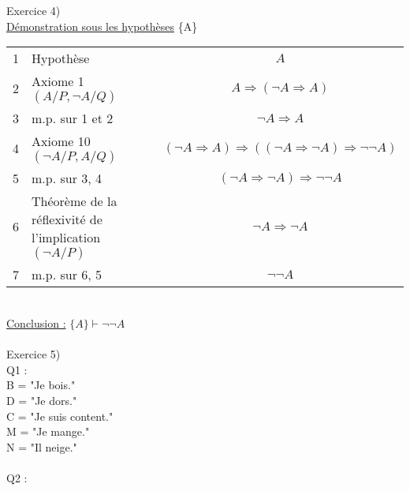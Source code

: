 \documentclass{article}
\begin{document}
\vspace*{3mm}
\newline
\\
\\
Exercice 4)
\newline
\\
\underline{Démonstration sous les hypothèses} \{A\}
\newline
\\
\begin{tabular}{|C{2mm}|l c}
1 & Hypothèse & $A$  \\ 
2 & Axiome 1 $(A/P, \neg A/Q)$ & $A \Rightarrow (\neg A \Rightarrow A)$  \\ 
3 & m.p. sur 1 et 2 & $\neg A \Rightarrow A$  \\ 
4 & Axiome 10  $(\neg A/P, A/Q)$ & $(\neg A \Rightarrow A) \Rightarrow ((\neg A \Rightarrow \neg A) \Rightarrow \neg\neg A)$ \\ 
5 & m.p. sur 3, 4 & $(\neg A \Rightarrow \neg A) \Rightarrow \neg\neg A$ \\ 
6 & Théorème de la réflexivité de l'implication $(\neg A/P)$ & $\neg A \Rightarrow \neg A$  \\ 
7 & m.p. sur 6, 5 & $\neg\neg A$ \\ 
\end{tabular}
\vspace*{1mm}
\newline
\\
\underline{Conclusion :} $\{A\} \vdash \neg\neg A$
\newline
\\
\\
Exercice 5)
\newline
\\
Q1 :
\newline
\\
B = "Je bois."
\newline
\\
D = "Je dors."
\newline
\\
C = "Je suis content."
\newline
\\
M = "Je mange."
\newline
\\
N = "Il neige."
\newline
\\
\\
Q2 :
\newline
\\
\end{document}

